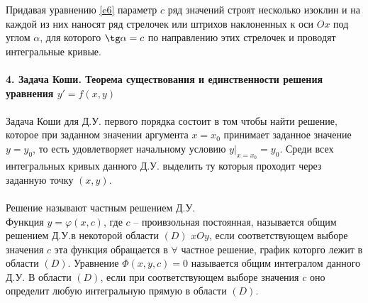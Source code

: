 \documentclass{article}
\numberwithin{equation}{section}
\begin{document}
Придавая уравнению \ref{e6} параметр $c$ ряд значений строят несколько изоклин и на каждой из них наносят ряд стрелочек или штрихов наклоненных к оси $Ox$ под углом $\alpha$, для которого $\tg\alpha=c$ по направлению этих стрелочек и проводят интегральные кривые.
\\\\
\textbf{4. Задача Коши. Теорема существования и единственности решения уравнения $y'=f(x,y)$}
\\\\
Задача Коши для Д.У. первого порядка состоит в том чтобы найти решение, которое при заданном значении аргумента $x=x_0$ принимает заданное значение $y=y_0$, то есть удовлетворяет начальному условию $y|_{x=x_0}=y_0$. Среди всех интегральных кривых данного Д.У. выделить ту которыя проходит через заданную точку $(x,y)$.\\\\
Решение называют частным решением Д.У.\\
Функция $y=\varphi(x,c)$, где $c$ -- проивзольная постоянная, называется общим решением Д.У.в некоторой области $(D)$ $xOy$, если соответствующем выборе значения $c$ эта функция обращается в $\forall$ частное решение, график которго лежит в области $(D)$. Уравнение $\Phi(x,y,c)=0$ называется общим интегралом данного Д.У. В области $(D)$, если при соответствующем выборе значения $c$ оно определит любую интегральную прямую в области $(D)$.
\end{document}
